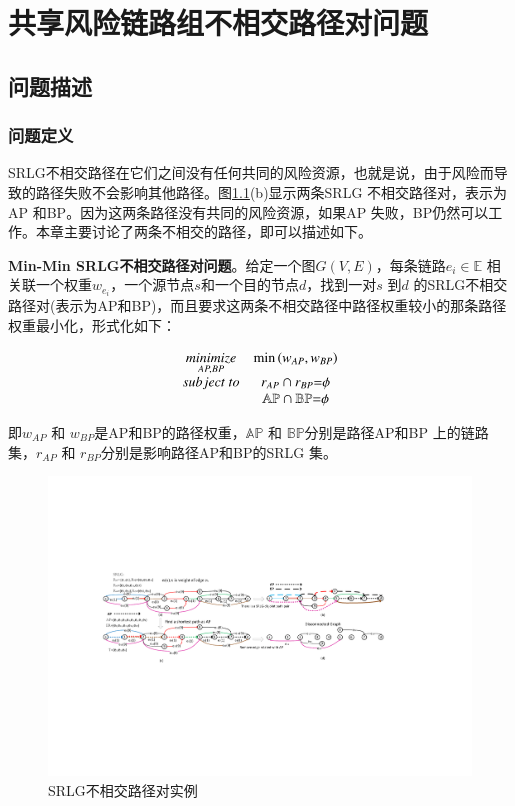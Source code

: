 \chapter{共享风险链路组不相交路径对问题}

\section{问题描述}
\subsection{问题定义}
SRLG不相交路径在它们之间没有任何共同的风险资源，也就是说，由于风险而导致的路径失败不会影响其他路径。图\ref{fig:CompositeGraph}(b)显示两条SRLG 不相交路径对，表示为AP 和BP。因为这两条路径没有共同的风险资源，如果AP 失败，BP仍然可以工作。本章主要讨论了两条不相交的路径，即可以描述如下。

\textbf{Min-Min SRLG不相交路径对问题}。给定一个图$G(V,E)$，每条链路$e_i\in \mathbb{E}$ 相关联一个权重$w_{e_i}$，一个源节点$s$和一个目的节点$d$，找到一对$s$ 到$d$ 的SRLG不相交路径对(表示为AP和BP)，而且要求这两条不相交路径中路径权重较小的那条路径权重最小化，形式化如下：

\begin{equation}
\begin{array}{*{20}{c}}
   {\mathop {minimize}\limits_{AP,BP} } & {\min \left( {{w_{AP}},{w_{BP}}} \right)}  \\
   {subject\ to} & {{r_{AP}} \cap {r_{BP}}{\rm{ = }}\phi }  \\
   {} & {\mathbb{AP} \cap \mathbb{BP}{\rm{ = }}\phi }  \\
\end{array}
\label{eq:problem definition}
\end{equation}

即${w_{AP}}$ 和 ${w_{BP}}$是AP和BP的路径权重，$\mathbb{AP}$ 和 $\mathbb{BP}$分别是路径AP和BP 上的链路集，${r_{AP}}$ 和 ${r_{BP}}$分别是影响路径AP和BP的SRLG 集。

\begin{figure}[htbp]
  \centering
  \includegraphics[width=7.2in]{figures/CompositeGraph}
  \caption{SRLG不相交路径对实例}
  \label{fig:CompositeGraph}
\end{figure}

